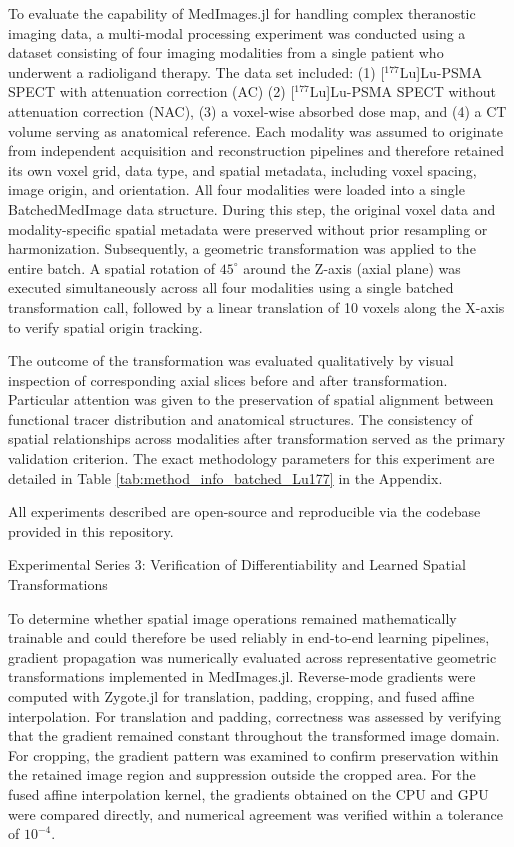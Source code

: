 \documentclass[10pt,letterpaper]{article}
\begin{document}
To evaluate the capability of MedImages.jl for handling complex theranostic imaging data, a multi-modal processing experiment was conducted using a dataset consisting of four imaging modalities from a single patient who underwent a radioligand therapy. The data set included: (1) [$^{177}$Lu]Lu-PSMA SPECT with attenuation correction (AC) (2) [$^{177}$Lu]Lu-PSMA SPECT without attenuation correction (NAC), (3) a voxel-wise absorbed dose map, and (4) a CT volume serving as anatomical reference. Each modality was assumed to originate from independent acquisition and reconstruction pipelines and therefore retained its own voxel grid, data type, and spatial metadata, including voxel spacing, image origin, and orientation. All four modalities were loaded into a single BatchedMedImage data structure. During this step, the original voxel data and modality-specific spatial metadata were preserved without prior resampling or harmonization. Subsequently, a geometric transformation was applied to the entire batch. A spatial rotation of $45^{\circ}$ around the Z-axis (axial plane) was executed simultaneously across all four modalities using a single batched transformation call, followed by a linear translation of 10 voxels along the X-axis to verify spatial origin tracking.


The outcome of the transformation was evaluated qualitatively by visual inspection of corresponding axial slices before and after transformation. Particular attention was given to the preservation of spatial alignment between functional tracer distribution and anatomical structures. The consistency of spatial relationships across modalities after transformation served as the primary validation criterion. The exact methodology parameters for this experiment are detailed in Table \ref{tab:method_info_batched_Lu177} in the Appendix. 

 All experiments described are open-source and reproducible via the codebase provided in this repository.

Experimental Series 3: Verification of Differentiability and Learned Spatial Transformations

To determine whether spatial image operations remained mathematically trainable and could therefore be used reliably in end-to-end learning pipelines, gradient propagation was numerically evaluated across representative geometric transformations implemented in MedImages.jl. Reverse-mode gradients were computed with Zygote.jl for translation, padding, cropping, and fused affine interpolation. For translation and padding, correctness was assessed by verifying that the gradient remained constant throughout the transformed image domain. For cropping, the gradient pattern was examined to confirm preservation within the retained image region and suppression outside the cropped area. For the fused affine interpolation kernel, the gradients obtained on the CPU and GPU were compared directly, and numerical agreement was verified within a tolerance of $10^{-4}$. 
\end{document}
